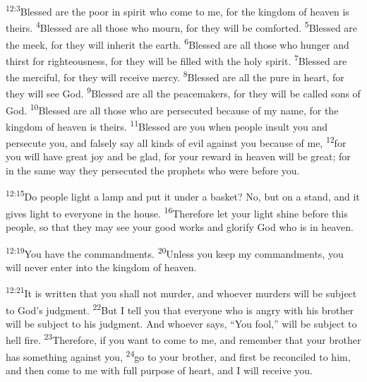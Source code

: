 \documentclass[openany,12pt,english]{book}
\newenvironment{para}{\par\pretolerance=100\tolerance=200\setlength{\emergencystretch}{0.6em}\relax}{\par}
\begin{document}
\begin{para}
    \textsuperscript{12:3}\thinspace{}Bless\-ed are the poor in spir\-it who come to me, for the king\-dom of heav\-en is theirs.
    \textsuperscript{4}\thinspace{}Bless\-ed are all those who mourn, for they will be comforted.
    \textsuperscript{5}\thinspace{}Bless\-ed are the meek, for they will in\-her\-it the earth.
    \textsuperscript{6}\thinspace{}Bless\-ed are all those who hun\-ger and thirst for right\-eous\-ness, for they will be filled with the ho\-ly spir\-it.
    \textsuperscript{7}\thinspace{}Bless\-ed are the mer\-ci\-ful, for they will re\-ceive mer\-cy.
    \textsuperscript{8}\thinspace{}Bless\-ed are all the pure in heart, for they will see God.
    \textsuperscript{9}\thinspace{}Bless\-ed are all the peacemakers, for they will be called sons of God.
    \textsuperscript{10}\thinspace{}Bless\-ed are all those who are per\-se\-cut\-ed be\-cause of my name, for the king\-dom of heav\-en is theirs.
    \textsuperscript{11}\thinspace{}Bless\-ed are you when peo\-ple in\-sult you and per\-se\-cute you, and false\-ly say all kinds of evil a\-gainst you be\-cause of me,
    \textsuperscript{12}\thinspace{}for you will have great joy and be glad, for your re\-ward in heav\-en will be great; for in the same way they per\-se\-cut\-ed the prophets who were be\-fore you.
\end{para}

\begin{para}
    \textsuperscript{12:15}\thinspace{}Do peo\-ple light a lamp and put it un\-der a bas\-ket? No, but on a stand, and it gives light to eve\-ry\-one in the house.
    \textsuperscript{16}\thinspace{}There\-fore let your light shine be\-fore this peo\-ple, so that they may see your good works and glo\-ri\-fy God who is in heav\-en.
\end{para}

\begin{para}
    \textsuperscript{12:19}\thinspace{}You have the commandments.
    \textsuperscript{20}\thinspace{}Un\-less you keep my commandments, you will nev\-er en\-ter in\-to the king\-dom of heav\-en.
\end{para}

\begin{para}
    \textsuperscript{12:21}\thinspace{}It is writ\-ten that you shall not mur\-der, and who\-ev\-er murders will be sub\-ject to God's judg\-ment.
    \textsuperscript{22}\thinspace{}But I tell you that eve\-ry\-one who is an\-gry with his broth\-er will be sub\-ject to his judg\-ment. And who\-ev\-er says, “You fool,” will be sub\-ject to hell fire.
    \textsuperscript{23}\thinspace{}There\-fore, if you want to come to me, and re\-mem\-ber that your broth\-er has some\-thing a\-gainst you,
    \textsuperscript{24}\thinspace{}go to your broth\-er, and first be rec\-on\-ciled to him, and then come to me with full pur\-pose of heart, and I will re\-ceive you.
\end{para}
\end{document}
